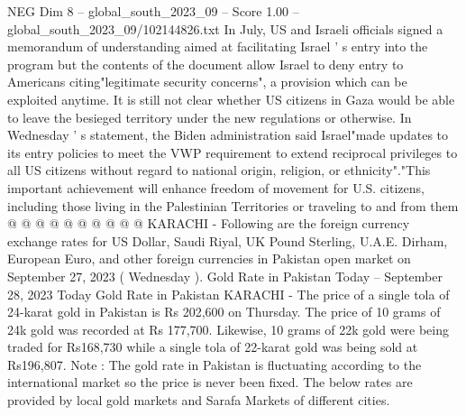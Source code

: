 \begin{textsample}{NEG Dim 8 – global\_south\_2023\_09 – Score 1.00 – global\_south\_2023\_09/102144826.txt}
In July, US and Israeli officials signed a memorandum of understanding aimed at facilitating Israel ' s entry into the program but the contents of the document allow Israel to deny entry to Americans citing"legitimate security concerns", a provision which can be exploited anytime.
It is still not clear whether US citizens in Gaza would be able to leave the besieged territory under the new regulations or otherwise.
In Wednesday ' s statement, the Biden administration said Israel"made updates to its entry policies to meet the VWP requirement to extend reciprocal privileges to all US citizens without regard to national origin, religion, or ethnicity"."This important achievement will enhance freedom of movement for U.S. citizens, including those living in the Palestinian Territories or traveling to and from them @ @ @ @ @ @ @ @ @ @ KARACHI - Following are the foreign currency exchange rates for US Dollar, Saudi Riyal, UK Pound Sterling, U.A.E.
Dirham, European Euro, and other foreign currencies in Pakistan open market on September 27, 2023 ( Wednesday ).
Gold Rate in Pakistan Today -- September 28, 2023 Today Gold Rate in Pakistan KARACHI - The price of a single tola of 24-karat gold in Pakistan is Rs 202,600 on Thursday.
The price of 10 grams of 24k gold was recorded at Rs 177,700.
Likewise, 10 grams of 22k gold were being traded for Rs168,730 while a single tola of 22-karat gold was being sold at Rs196,807.
Note : The gold rate in Pakistan is fluctuating according to the international market so the price is never been fixed.
The below rates are provided by local gold markets and Sarafa Markets of different cities.

\end{textsample}
